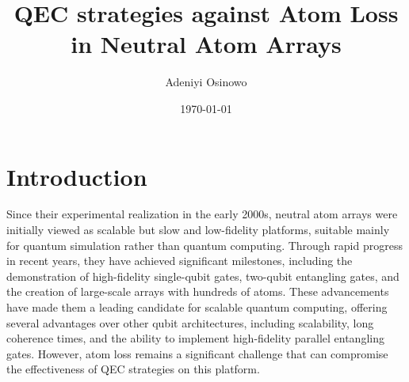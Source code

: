 \documentclass[aps,prb,twocolumn,superscriptaddress,nobibnotes]{revtex4-2} %
\begin{document}
\title{QEC strategies against Atom Loss in Neutral Atom Arrays}
\author{Adeniyi Osinowo}
\date{\today}
\begin{abstract}
\end{abstract}
\maketitle

\section{Introduction}%
Since their experimental realization in the early 2000s, neutral atom arrays were initially viewed as scalable but slow and low-fidelity platforms, suitable mainly for quantum simulation rather than quantum computing.
Through rapid progress in recent years, they have achieved significant milestones, including the demonstration of high-fidelity single-qubit gates, two-qubit entangling gates, and the creation of large-scale arrays with hundreds of atoms.
These advancements have made them a leading candidate for scalable quantum computing, offering several advantages over other qubit architectures, including scalability, long coherence times, and the ability to implement high-fidelity parallel entangling gates.
However, atom loss remains a significant challenge that can compromise the effectiveness of QEC strategies on this platform.
\end{document}

